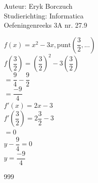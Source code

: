 \documentclass[a4paper]{article}
\begin{document}
  
\noindent \large Auteur: Eryk Borczuch \\
\noindent \large Studierichting: Informatica\\
\noindent \large Oefeningenreeks 3A nr. 27.9\\

\medskip

\normalsize

$f(x) = x^2-3x, \text{punt} \left(\dfrac{3}{2}, ...\right)$\\

$f\left( \dfrac{3}{2} \right) = \left (\dfrac{3}{2} \right)^2 -3\left(\dfrac{3}{2}\right)$\\

$ = \dfrac{9}{4} - \dfrac{9}{2}$\\

$ = \dfrac{-9}{4}$\\

$f'(x) = 2x-3$\\

$f'\left(\dfrac{3}{2}\right) = 2\dfrac{3}{2}-3$\\

$ = 0$\\

$y - \dfrac{9}{4} = 0$\\

$y = \dfrac{-9}{4}$\\

\begin{thebibliography}{999}
\end{thebibliography}
\end{document}
